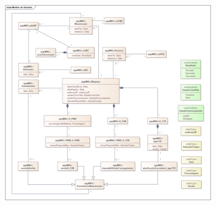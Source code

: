 \documentclass{article}
\begin{document}
    \pagebreak
    \begin{figure}[H]
        \centering
        \vspace*{1.1cm}
        \hspace*{-1.75cm}
        \includegraphics[origin=c, angle=-90, scale=0.85]{modelo_dominio.png}
    \end{figure}
\end{document}
